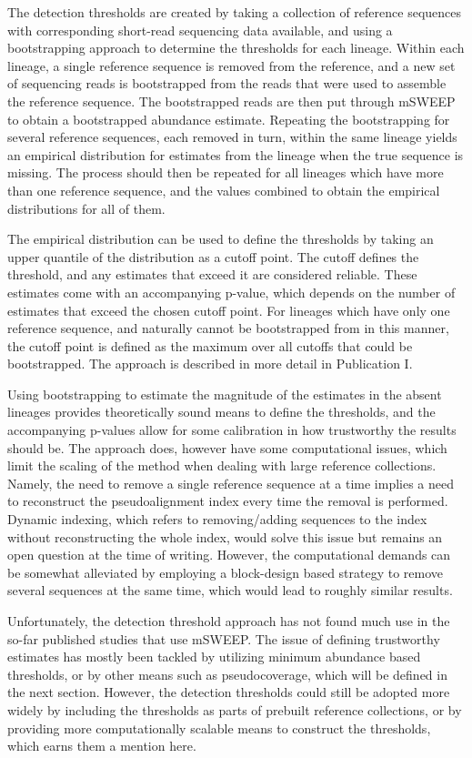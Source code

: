 \documentclass[officiallayout]{tktla}
\begin{document}
\pagebreak
The detection thresholds are created by taking a collection of
reference sequences with corresponding short-read sequencing data
available, and using a bootstrapping approach to determine the
thresholds for each lineage. Within each lineage, a single reference
sequence is removed from the reference, and a new set of sequencing
reads is bootstrapped from the reads that were used to assemble the
reference sequence. The bootstrapped reads are then put through mSWEEP
to obtain a bootstrapped abundance estimate. Repeating the
bootstrapping for several reference sequences, each removed in turn,
within the same lineage yields an empirical distribution for estimates
from the lineage when the true sequence is missing. The process should
then be repeated for all lineages which have more than one reference
sequence, and the values combined to obtain the empirical
distributions for all of them.

The empirical distribution can be used to define the thresholds by
taking an upper quantile of the distribution as a cutoff point. The
cutoff defines the threshold, and any estimates that exceed it are
considered reliable. These estimates come with an accompanying
p-value, which depends on the number of estimates that exceed the
chosen cutoff point. For lineages which have only one reference
sequence, and naturally cannot be bootstrapped from in this manner,
the cutoff point is defined as the maximum over all cutoffs that could
be bootstrapped. The approach is described in more detail in Publication I.

Using bootstrapping to estimate the magnitude of the estimates in the
absent lineages provides theoretically sound means to define the
thresholds, and the accompanying p-values allow for some calibration
in how trustworthy the results should be. The approach does, however
have some computational issues, which limit the scaling of the method
when dealing with large reference collections. Namely, the need to
remove a single reference sequence at a time implies a need to
reconstruct the pseudoalignment index every time the removal is
performed. Dynamic indexing, which refers to removing/adding sequences
to the index without reconstructing the whole index, would solve this
issue but remains an open question at the time of writing. However,
the computational demands can be somewhat alleviated by employing a
block-design based strategy to remove several sequences at
the same time, which would lead to roughly similar results.

\vfill
\pagebreak
Unfortunately, the detection threshold approach has not found much use
in the so-far published studies that use mSWEEP. The issue of defining
trustworthy estimates has mostly been tackled by utilizing minimum
abundance based thresholds, or by other means such as pseudocoverage,
which will be defined in the next section. However, the detection
thresholds could still be adopted more widely by including the
thresholds as parts of prebuilt reference collections, or by providing
more computationally scalable means to construct the thresholds, which
earns them a mention here.
\end{document}

